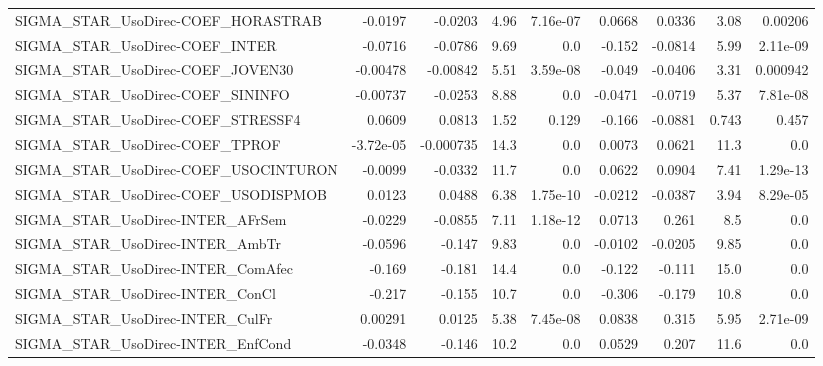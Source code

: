 \begin{tabular}{lrrrrrrrr}
SIGMA\_STAR\_UsoDirec-COEF\_HORASTRAB     &     -0.0197 &      -0.0203 &     4.96 & 7.16e-07 &     0.0668 &      0.0336 &         3.08 &       0.00206 \\
SIGMA\_STAR\_UsoDirec-COEF\_INTER         &     -0.0716 &      -0.0786 &     9.69 &      0.0 &     -0.152 &     -0.0814 &         5.99 &      2.11e-09 \\
SIGMA\_STAR\_UsoDirec-COEF\_JOVEN30       &    -0.00478 &     -0.00842 &     5.51 & 3.59e-08 &     -0.049 &     -0.0406 &         3.31 &      0.000942 \\
SIGMA\_STAR\_UsoDirec-COEF\_SININFO       &    -0.00737 &      -0.0253 &     8.88 &      0.0 &    -0.0471 &     -0.0719 &         5.37 &      7.81e-08 \\
SIGMA\_STAR\_UsoDirec-COEF\_STRESSF4      &      0.0609 &       0.0813 &     1.52 &    0.129 &     -0.166 &     -0.0881 &        0.743 &         0.457 \\
SIGMA\_STAR\_UsoDirec-COEF\_TPROF         &   -3.72e-05 &    -0.000735 &     14.3 &      0.0 &     0.0073 &      0.0621 &         11.3 &           0.0 \\
SIGMA\_STAR\_UsoDirec-COEF\_USOCINTURON   &     -0.0099 &      -0.0332 &     11.7 &      0.0 &     0.0622 &      0.0904 &         7.41 &      1.29e-13 \\
SIGMA\_STAR\_UsoDirec-COEF\_USODISPMOB    &      0.0123 &       0.0488 &     6.38 & 1.75e-10 &    -0.0212 &     -0.0387 &         3.94 &      8.29e-05 \\
SIGMA\_STAR\_UsoDirec-INTER\_AFrSem       &     -0.0229 &      -0.0855 &     7.11 & 1.18e-12 &     0.0713 &       0.261 &          8.5 &           0.0 \\
SIGMA\_STAR\_UsoDirec-INTER\_AmbTr        &     -0.0596 &       -0.147 &     9.83 &      0.0 &    -0.0102 &     -0.0205 &         9.85 &           0.0 \\
SIGMA\_STAR\_UsoDirec-INTER\_ComAfec      &      -0.169 &       -0.181 &     14.4 &      0.0 &     -0.122 &      -0.111 &         15.0 &           0.0 \\
SIGMA\_STAR\_UsoDirec-INTER\_ConCl        &      -0.217 &       -0.155 &     10.7 &      0.0 &     -0.306 &      -0.179 &         10.8 &           0.0 \\
SIGMA\_STAR\_UsoDirec-INTER\_CulFr        &     0.00291 &       0.0125 &     5.38 & 7.45e-08 &     0.0838 &       0.315 &         5.95 &      2.71e-09 \\
SIGMA\_STAR\_UsoDirec-INTER\_EnfCond      &     -0.0348 &       -0.146 &     10.2 &      0.0 &     0.0529 &       0.207 &         11.6 &           0.0 \\

\end{tabular}
